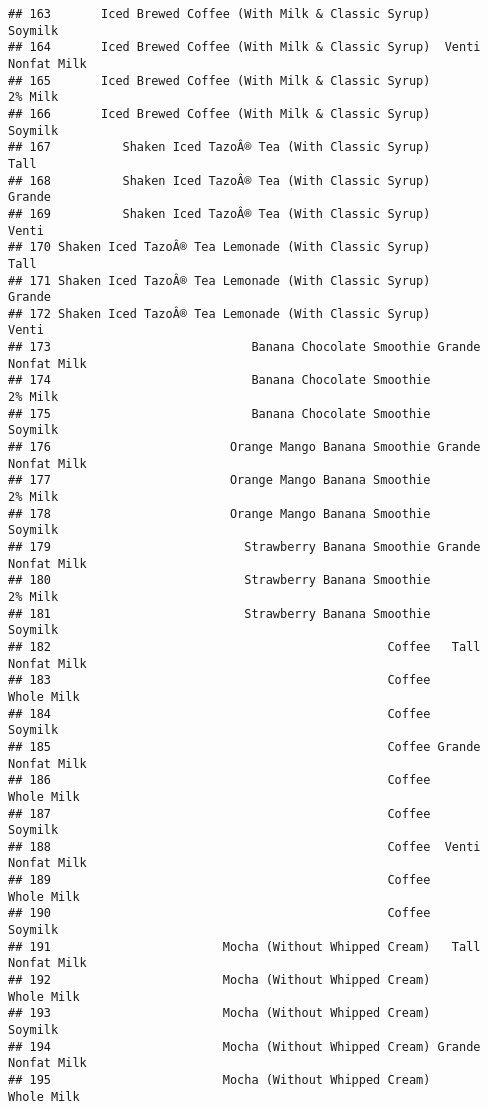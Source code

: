 \documentclass[
]{article}
\begin{document}
\begin{verbatim}
## 163       Iced Brewed Coffee (With Milk & Classic Syrup)            Soymilk
## 164       Iced Brewed Coffee (With Milk & Classic Syrup)  Venti Nonfat Milk
## 165       Iced Brewed Coffee (With Milk & Classic Syrup)            2% Milk
## 166       Iced Brewed Coffee (With Milk & Classic Syrup)            Soymilk
## 167          Shaken Iced TazoÂ® Tea (With Classic Syrup)               Tall
## 168          Shaken Iced TazoÂ® Tea (With Classic Syrup)             Grande
## 169          Shaken Iced TazoÂ® Tea (With Classic Syrup)              Venti
## 170 Shaken Iced TazoÂ® Tea Lemonade (With Classic Syrup)               Tall
## 171 Shaken Iced TazoÂ® Tea Lemonade (With Classic Syrup)             Grande
## 172 Shaken Iced TazoÂ® Tea Lemonade (With Classic Syrup)              Venti
## 173                            Banana Chocolate Smoothie Grande Nonfat Milk
## 174                            Banana Chocolate Smoothie            2% Milk
## 175                            Banana Chocolate Smoothie            Soymilk
## 176                         Orange Mango Banana Smoothie Grande Nonfat Milk
## 177                         Orange Mango Banana Smoothie            2% Milk
## 178                         Orange Mango Banana Smoothie            Soymilk
## 179                           Strawberry Banana Smoothie Grande Nonfat Milk
## 180                           Strawberry Banana Smoothie            2% Milk
## 181                           Strawberry Banana Smoothie            Soymilk
## 182                                               Coffee   Tall Nonfat Milk
## 183                                               Coffee         Whole Milk
## 184                                               Coffee            Soymilk
## 185                                               Coffee Grande Nonfat Milk
## 186                                               Coffee         Whole Milk
## 187                                               Coffee            Soymilk
## 188                                               Coffee  Venti Nonfat Milk
## 189                                               Coffee         Whole Milk
## 190                                               Coffee            Soymilk
## 191                        Mocha (Without Whipped Cream)   Tall Nonfat Milk
## 192                        Mocha (Without Whipped Cream)         Whole Milk
## 193                        Mocha (Without Whipped Cream)            Soymilk
## 194                        Mocha (Without Whipped Cream) Grande Nonfat Milk
## 195                        Mocha (Without Whipped Cream)         Whole Milk

\end{verbatim}
\end{document}
